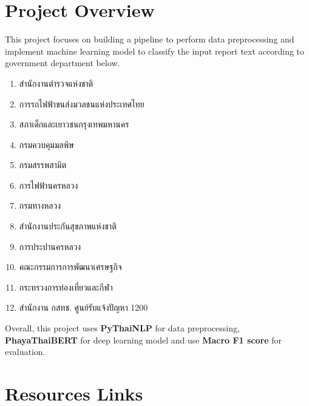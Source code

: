 \documentclass[12pt, a4paper]{article}
\begin{document}
        \section{Project Overview}
            This project focuses on building a pipeline to perform data preprocessing and implement machine learning model
            to classify the input report text according to government department below.
            \begin{enumerate}
                \item สำนักงานตำรวจแห่งชาติ
                \item การรถไฟฟ้าขนส่งมวลชนแห่งประเทศไทย
                \item สภาเด็กและเยาวชนกรุงเทพมหานคร
                \item กรมควบคุมมลพิษ
                \item กรมสรรพสามิต
                \item การไฟฟ้านครหลวง
                \item กรมทางหลวง
                \item สำนักงานประกันสุขภาพแห่งชาติ
                \item การประปานครหลวง
                \item คณะกรรมการการพัฒนาเศรษฐกิจ
                \item กระทรวงการท่องเที่ยวและกีฬา
                \item สำนักงาน กสทช. ศูนย์รับแจ้งปัญหา 1200
            \end{enumerate}

            Overall, this project uses \textbf{PyThaiNLP} for data preprocessing, \textbf{PhayaThaiBERT} for deep learning model
            and use \textbf{Macro F1 score} for evaluation.

    \pagebreak

        \section{Resources Links}
\end{document}
